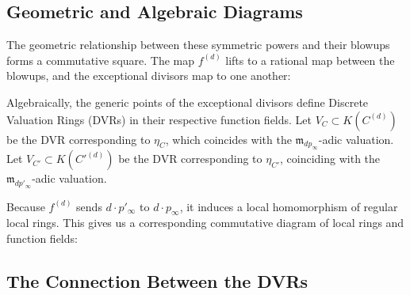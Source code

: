\subsection*{Geometric and Algebraic Diagrams}

The geometric relationship between these symmetric powers and their blowups forms a commutative square. The map $f^{(d)}$ lifts to a rational map between the blowups, and the exceptional divisors map to one another:

\vspace{1em}
\begin{center}
\end{center}
\vspace{1em}

Algebraically, the generic points of the exceptional divisors define Discrete Valuation Rings (DVRs) in their respective function fields. Let $V_C \subset K(C^{(d)})$ be the DVR corresponding to $\eta_C$, which coincides with the $\mathfrak{m}_{d p_\infty}$-adic valuation. Let $V_{C'} \subset K(C'^{(d)})$ be the DVR corresponding to $\eta_{C'}$, coinciding with the $\mathfrak{m}_{d p'_\infty}$-adic valuation. 

Because $f^{(d)}$ sends $d \cdot p'_\infty$ to $d \cdot p_\infty$, it induces a local homomorphism of regular local rings. This gives us a corresponding commutative diagram of local rings and function fields:

\vspace{1em}
\begin{center}
\end{center}
\vspace{1em}

\subsection*{The Connection Between the DVRs}

